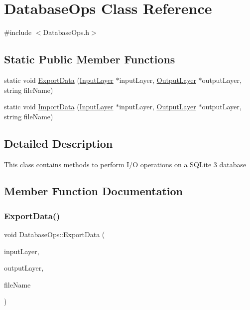 \hypertarget{class_database_ops}{}\section{Database\+Ops Class Reference}
\label{class_database_ops}


{\ttfamily \#include $<$Database\+Ops.\+h$>$}

\subsection*{Static Public Member Functions}
\begin{DoxyCompactItemize}
\item 
static void \mbox{\hyperlink{class_database_ops_ad0ef679ce1c5887086df2677f32cbc22}{Export\+Data}} (\mbox{\hyperlink{class_input_layer}{Input\+Layer}} $\ast$input\+Layer, \mbox{\hyperlink{class_output_layer}{Output\+Layer}} $\ast$output\+Layer, string file\+Name)
\item 
static void \mbox{\hyperlink{class_database_ops_a0fafb6f340c8ab353e243a64d1775966}{Import\+Data}} (\mbox{\hyperlink{class_input_layer}{Input\+Layer}} $\ast$input\+Layer, \mbox{\hyperlink{class_output_layer}{Output\+Layer}} $\ast$output\+Layer, string file\+Name)
\end{DoxyCompactItemize}


\subsection{Detailed Description}
This class contains methods to perform I/O operations on a S\+Q\+Lite 3 database 

\subsection{Member Function Documentation}
\mbox{\label{class_database_ops_ad0ef679ce1c5887086df2677f32cbc22}} 
\subsubsection{\texorpdfstring{Export\+Data()}{ExportData()}}
{\footnotesize\ttfamily void Database\+Ops\+::\+Export\+Data (\begin{DoxyParamCaption}\item[{\mbox{\hyperlink{class_input_layer}{Input\+Layer}} $\ast$}]{input\+Layer,  }\item[{\mbox{\hyperlink{class_output_layer}{Output\+Layer}} $\ast$}]{output\+Layer,  }\item[{string}]{file\+Name }\end{DoxyParamCaption})\hspace{0.3cm}{\ttfamily [static]}}


